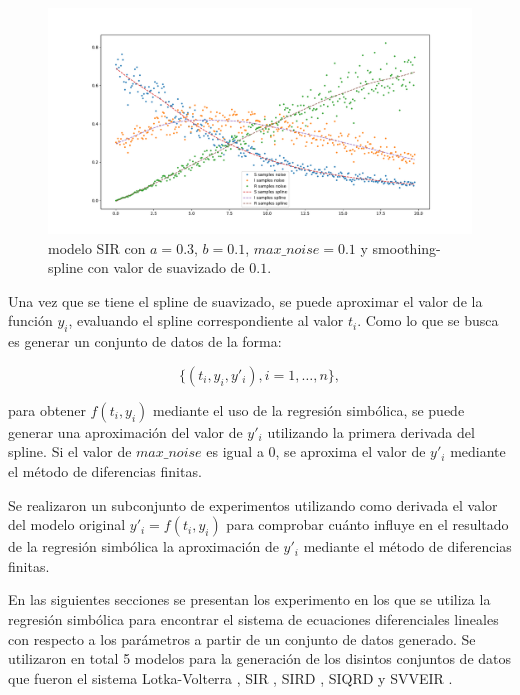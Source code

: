 \begin{figure}[h]
    \centering
    \includegraphics[width=\textwidth]{"figures/SIR_noise_with_spline.pdf"}
    \caption{modelo SIR con $a = 0.3$, $b = 0.1$, $max\_noise = 0.1$ y smoothing-spline con valor de suavizado de $0.1$.}
    \label{fig:SIR_noise_with_spline}
\end{figure}

Una vez que se tiene el spline de suavizado, se puede aproximar el valor de la función $y_i$, evaluando el spline correspondiente al valor $t_i$. Como lo que se busca es generar un conjunto de datos de la forma:

$$\{(t_i, y_i, y'_i), i=1, \dots, n\},$$

para obtener $f(t_i, y_i)$ mediante el uso de la regresión simbólica, se puede generar una aproximación del valor de $y'_i$ utilizando la primera derivada del spline. Si el valor de $max\_noise$ es igual a 0, se aproxima el valor de $y'_i$ mediante el método de diferencias finitas.

Se realizaron un subconjunto de experimentos utilizando como derivada el valor del modelo original $y'_i = f(t_i, y_i)$ para comprobar cuánto influye en el resultado de la regresión simbólica la aproximación de $y'_i$ mediante el método de diferencias finitas.

En las siguientes secciones se presentan los experimento en los que se utiliza la regresión simbólica para encontrar el sistema de ecuaciones diferenciales lineales con respecto a los parámetros a partir de un conjunto de datos generado. Se utilizaron en total 5 modelos para la generación de los disintos conjuntos de datos que fueron el sistema Lotka-Volterra \cite{Hoppensteadt:2006}, SIR \cite{weiss2013sir}, SIRD \cite{bailey1975mathematical}, SIQRD \cite{molter2021mathematical} y SVVEIR \cite{kuddus2021mathematical}.

